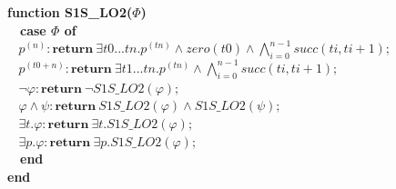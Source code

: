 \documentclass{article}
\begin{document}
\begin{multicols}{4}
\textbf{function S1S\_LO2($\Phi$)} \\
\ \ \textbf{case $\Phi$ of} \\
$\ \ \ \ p^{(n)} : \textbf{return}\ \exists t0...tn. p^{(tn)} \wedge zero(t0) \wedge \bigwedge_{i=0}^{n-1} succ(ti, ti + 1); $ \\
$\ \ \ \ p^{(t0 + n)} : \textbf{return}\ \exists t1...tn. p^{(tn)} \wedge \bigwedge_{i=0}^{n-1} succ(ti, ti + 1); $ \\
$\ \ \ \ \neg \varphi : \textbf{return}\ \neg S1S\_LO2(\varphi); $ \\
$\ \ \ \ \varphi \wedge \psi : \textbf{return}\ S1S\_LO2(\varphi) \wedge S1S\_LO2(\psi); $ \\
$\ \ \ \ \exists t.\varphi : \textbf{return}\ \exists t.S1S\_LO2(\varphi);$ \\
$\ \ \ \ \exists p.\varphi : \textbf{return}\ \exists p.S1S\_LO2(\varphi); $ \\
\ \ \textbf{end} \\
\textbf{end} \\

\end{multicols}
\end{document}
